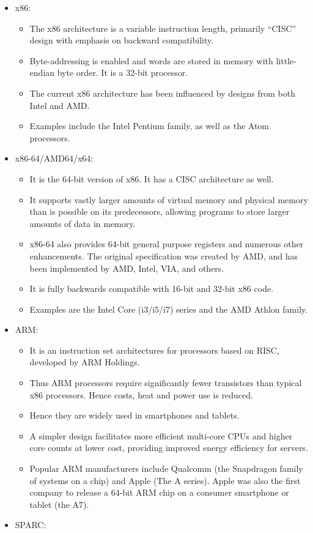 \documentclass[]{article}
\begin{document}
\begin{itemize}
\itemsep1pt\parskip0pt
\item
  x86:

  \begin{itemize}
  \itemsep1pt\parskip0pt
  \item
    The x86 architecture is a variable instruction length, primarily
    ``CISC'' design with emphasis on backward compatibility.
  \item
    Byte-addressing is enabled and words are stored in memory with
    little-endian byte order. It is a 32-bit processor.
  \item
    The current x86 architecture has been influenced by designs from
    both Intel and AMD.
  \item
    Examples include the Intel Pentium family, as well as the Atom
    processors.
  \end{itemize}
\item
  x86-64/AMD64/x64:

  \begin{itemize}
  \itemsep1pt\parskip0pt
  \item
    It is the 64-bit version of x86. It has a CISC architecture as well.
  \item
    It supports vastly larger amounts of virtual memory and physical
    memory than is possible on its predecessors, allowing programs to
    store larger amounts of data in memory.
  \item
    x86-64 also provides 64-bit general purpose registers and numerous
    other enhancements. The original specification was created by AMD,
    and has been implemented by AMD, Intel, VIA, and others.
  \item
    It is fully backwards compatible with 16-bit and 32-bit x86 code.
  \item
    Examples are the Intel Core (i3/i5/i7) series and the AMD Athlon
    family.
  \end{itemize}
\item
  ARM:

  \begin{itemize}
  \itemsep1pt\parskip0pt
  \item
    It is an instruction set architectures for processors based on RISC,
    developed by ARM Holdings.
  \item
    Thus ARM processors require significantly fewer transistors than
    typical x86 processors. Hence costs, heat and power use is reduced.
  \item
    Hence they are widely used in smartphones and tablets.
  \item
    A simpler design facilitates more efficient multi-core CPUs and
    higher core counts at lower cost, providing improved energy
    efficiency for servers.
  \item
    Popular ARM manufacturers include Qualcomm (the Snapdragon family of
    systems on a chip) and Apple (The A series). Apple was also the
    first company to release a 64-bit ARM chip on a consumer smartphone
    or tablet (the A7).
  \end{itemize}
\item
  SPARC:


\end{itemize}
\end{document}
